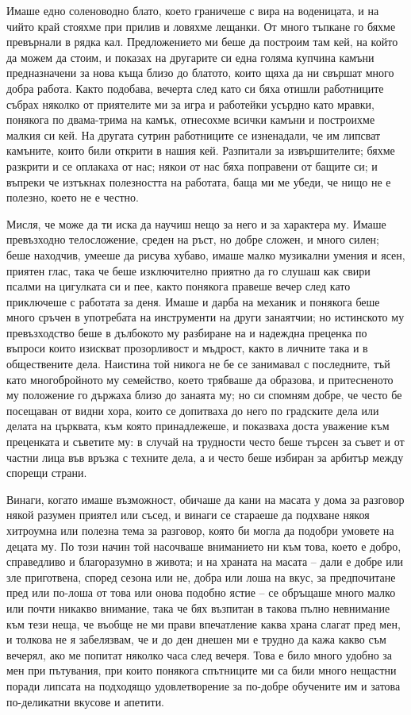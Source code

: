 \documentclass[12pt]{book}
\begin{document}
Имаше едно соленоводно блато, което граничеше с вира на воденицата, и на чийто край стояхме при прилив и ловяхме лещанки. От много тъпкане го бяхме превърнали в рядка кал. Предложението ми беше да построим там кей, на който да можем да стоим, и показах на другарите си една голяма купчина камъни предназначени за нова къща близо до блатото, които щяха да ни свършат много добра работа. Както подобава, вечерта след като си бяха отишли работниците събрах няколко от приятелите ми за игра и работейки усърдно като мравки, понякога по двама-трима на камък, отнесохме всички камъни и построихме малкия си кей. На другата сутрин работниците се изненадали, че им липсват камъните, които били открити в нашия кей. Разпитали за извършителите; бяхме разкрити и се оплакаха от нас; някои от нас бяха поправени от бащите си; и въпреки че изтъкнах полезността на работата, баща ми ме убеди, че нищо не е полезно, което не е честно. 

Мисля, че може да ти иска да научиш нещо за него и за характера му. Имаше превъзходно телосложение, среден на ръст, но добре сложен, и много силен; беше находчив, умееше да рисува хубаво, имаше малко музикални умения и ясен, приятен глас, така че беше изключително приятно да го слушаш как свири псалми на цигулката си и пее, както понякога правеше вечер след като приключеше с работата за деня. Имаше и дарба на механик и понякога беше много сръчен в употребата на инструменти на други занаятчии; но истинското му превъзходство беше в дълбокото му разбиране на и надеждна преценка по въпроси които изискват прозорливост и мъдрост, както в личните така и в обществените дела. Наистина той никога не бе се занимавал с последните, тъй като многобройното му семейство, което трябваше да образова, и притесненото му положение го държаха близо до занаята му; но си спомням добре, че често бе посещаван от видни хора, които се допитваха до него по градските дела или делата на църквата, към която принадлежеше, и показваха доста уважение към преценката и съветите му: в случай на трудности често беше търсен за съвет и от частни лица във връзка с техните дела, а и често беше избиран за арбитър между спорещи страни.

Винаги, когато имаше възможност, обичаше да кани на масата у дома за разговор някой разумен приятел или съсед, и винаги се стараеше да подхване някоя хитроумна или полезна тема за разговор, която би могла да подобри умовете на децата му. По този начин той насочваше вниманието ни към това, което е добро, справедливо и благоразумно в живота; и на храната на масата – дали е добре или зле приготвена, според сезона или не, добра или лоша на вкус, за предпочитане пред или по-лоша от това или онова подобно ястие – се обръщаше много малко или почти никакво внимание, така че бях възпитан в такова пълно невнимание към тези неща, че въобще не ми прави впечатление каква храна слагат пред мен, и толкова не я забелязвам, че и до ден днешен ми е трудно да кажа какво съм вечерял, ако ме попитат няколко часа след вечеря. Това е било много удобно за мен при пътувания, при които понякога спътниците ми са били много нещастни поради липсата на подходящо удовлетворение за по-добре обучените им и затова по-деликатни вкусове и апетити. 
\end{document}
